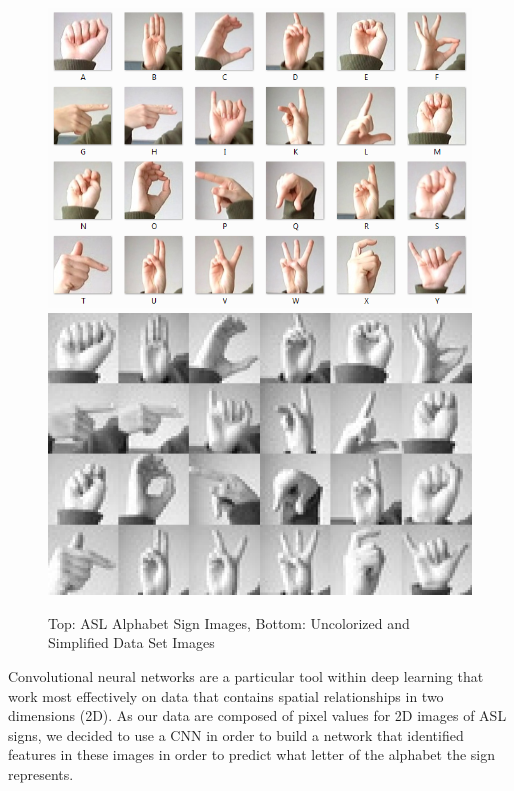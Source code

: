 \documentclass[11pt]{article}
\begin{document}
\begin{figure}[H]
\begin{center}
\includegraphics[scale=0.44]{images/amer_sign2.png}
\includegraphics[scale=0.62]{images/amer_sign3.png}
\caption{Top: ASL Alphabet Sign Images, Bottom: Uncolorized and Simplified Data Set Images}
\end{center}
\end{figure}

Convolutional neural networks are a particular tool within deep learning that work most effectively on data that contains spatial relationships in two dimensions (2D). As our data are composed of pixel values for 2D images of ASL signs, we decided to use a CNN in order to build a network that identified features in these images in order to predict what letter of the alphabet the sign represents.
\end{document}
